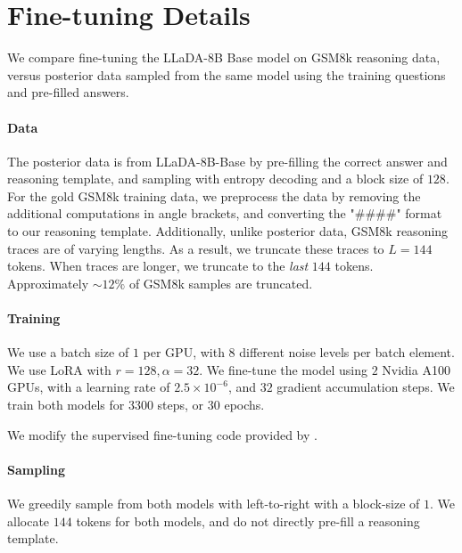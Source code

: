 \section{Fine-tuning Details}\label{appsec:finetuning}

We compare fine-tuning the LLaDA-8B Base \citep{nie2025largelanguagediffusionmodels} model on GSM8k \citep{cobbe2021training} reasoning data, versus posterior data sampled from the same model using the training questions and pre-filled answers.

\paragraph{Data}

The posterior data is from LLaDA-8B-Base by pre-filling the correct answer and reasoning template, and sampling with entropy decoding and a block size of $128$. For the gold GSM8k training data, we preprocess the data by removing the additional computations in angle brackets, and converting the "$\#\#\#\#$" format to our reasoning template. Additionally, unlike posterior data, GSM8k reasoning traces are of varying lengths. As a result, we truncate these traces to $L=144$ tokens. When traces are longer, we truncate to the \textit{last} $144$ tokens. Approximately $\sim 12\%$ of GSM8k samples are truncated. 

\paragraph{Training}

We use a batch size of $1$ per GPU, with $8$ different noise levels per batch element.
We use LoRA \citep{hu2022lora} with $r=128, \alpha=32$. We fine-tune the model using $2$ Nvidia A100 GPUs, with a learning rate of $2.5 \times 10^{-6}$, and $32$ gradient accumulation steps. We train both models for $3300$ steps, or $30$ epochs.


We modify the supervised fine-tuning code provided by \cite{zhao2025d1scalingreasoningdiffusion}.

\paragraph{Sampling}

We greedily sample from both models with left-to-right with a block-size of $1$. We allocate $144$ tokens for both models, and do not directly pre-fill a reasoning template. 


